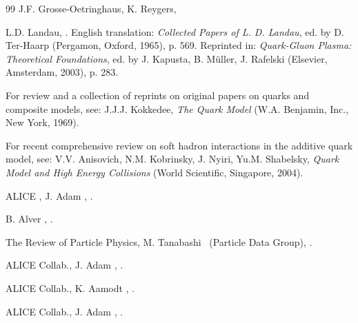 \documentclass[twocolumn,showpacs,preprintnumbers,prd,superscriptaddress,nofootinbib]{revtex4}
\begin{document}
\begin{thebibliography}{99}
 J.F. Grosse-Oetringhaus, K. Reygers,
  
 L.D. Landau, . 
  English
  translation: {\em Collected Papers of L. D. Landau}, ed. by D. Ter-Haarp 
  (Pergamon, Oxford, 1965), p. 569. Reprinted in: {\em Quark-Gluon 
  Plasma: Theoretical Foundations}, ed. by J. Kapusta,
  B. M\"uller, J. Rafelski (Elsevier, Amsterdam, 2003), p. 283.

  For review and a collection of reprints on original papers on quarks and 
 composite models,
 see: J.J.J. Kokkedee, {\em The Quark Model} (W.A. Benjamin, Inc., New 
York, 1969).

 For recent 
 comprehensive review on 
 soft hadron interactions in the additive quark model, see:
 V.V. Anisovich, N.M. Kobrinsky, J. Nyiri,
 Yu.M. Shabelsky, {\em Quark Model and High Energy Collisions}
 (World Scientific, Singapore, 2004).

 ALICE \col, J. Adam \ea,  .

  B. Alver \ea, .


 

  The Review of Particle Physics, 
 M. Tanabashi \ea\ (Particle Data Group), 
 .

 ALICE Collab.,  J. Adam \ea, . 
 
 ALICE Collab., K. Aamodt \ea,
    .

 ALICE Collab., J. Adam \ea, .


\end{thebibliography}
\end{document}
